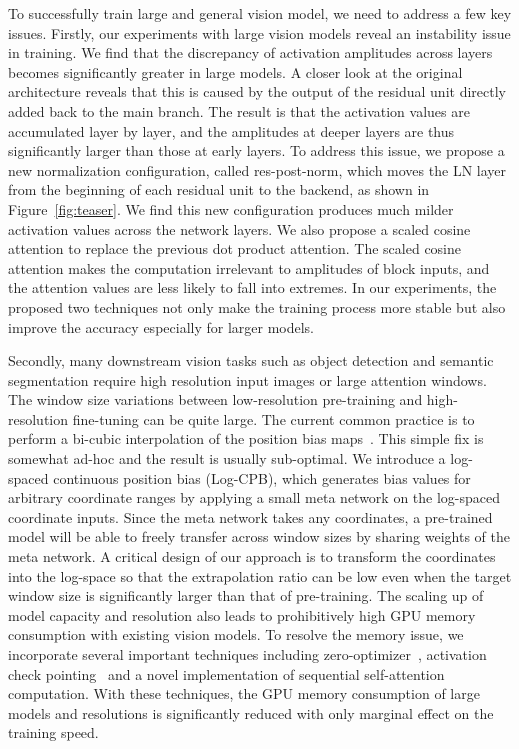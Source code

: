 \documentclass[10pt,twocolumn,letterpaper]{article}
\begin{document}
To successfully train large and general vision model, we need to address a few key issues. Firstly, our experiments with large vision models reveal an instability issue in training. We find that the discrepancy of activation amplitudes across layers becomes significantly greater in large models. A closer look at the original architecture reveals that this is caused by the output of the residual unit directly added back to the main branch. The result is that the activation values are accumulated layer by layer, and the amplitudes at deeper layers are thus significantly larger than those at early layers. To address this issue, we propose a new normalization configuration, called res-post-norm, which moves the LN layer from the beginning of each residual unit to the backend, as shown in Figure~\ref{fig:teaser}. We find this new configuration produces much milder activation values across the network layers. We also propose a scaled cosine attention to replace the previous dot product attention. The scaled cosine attention makes the computation irrelevant to amplitudes of block inputs, and the attention values are less likely to fall into extremes. In our experiments, the proposed two techniques not only make the training process more stable but also improve the accuracy especially for larger models. 


Secondly, many downstream vision tasks such as object detection and semantic segmentation require high resolution input images or large attention windows. The window size variations between low-resolution pre-training and high-resolution fine-tuning can be quite large. The current common practice is to perform a bi-cubic interpolation of the position bias maps~\cite{dosovitskiy2020vit,liu2021swin}. This simple fix is somewhat ad-hoc and the result is usually sub-optimal. We introduce a log-spaced continuous position bias (Log-CPB), which generates bias values for arbitrary coordinate ranges by applying a small meta network on the log-spaced coordinate inputs. Since the meta network takes any coordinates, a pre-trained model will be able to freely transfer across window sizes by sharing weights of the meta network. A critical design of our approach is to transform the coordinates into the log-space so that the extrapolation ratio can be low even when the target window size is significantly larger than that of pre-training. 
The scaling up of model capacity and resolution also leads to prohibitively high GPU memory consumption with existing vision models. To resolve the memory issue, we incorporate several important techniques including zero-optimizer~\cite{rajbhandari2020zero}, activation check pointing~\cite{chen2016training} and a novel implementation of sequential self-attention computation. With these techniques, the GPU memory consumption of large models and resolutions is significantly reduced with only marginal effect on the training speed. 
\end{document}
